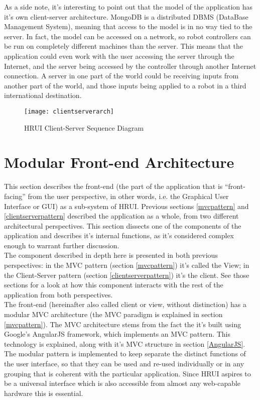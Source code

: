 As a side note, it's interesting to point out that the model of the application has it's own client-server architecture. 
MongoDB is a distributed DBMS (DataBase Management System), meaning that access to the model is in no way tied to the server. 
In fact, the model can be accessed on a network, so robot controllers can be run on completely different machines than the 
server. This means that the application could even work with the user accessing the server through the Internet, and the 
server being accessed by the controller through another Internet connection. A server in one part of the world could be 
receiving inputs from another part of the world, and those inputs being applied to a robot in a third international 
destination.
\begin{figure}[H]
\centering
\captionsetup{justification=centering}
\texttt{[image: clientserverarch]}
\caption{HRUI Client-Server Sequence Diagram \label{clientserverarch}}
\end{figure}
\section{Modular Front-end Architecture} \label{modularfrontendarchitecture}
This section describes the front-end (the part of the application that is ``front-facing'' from the user perspective, in other 
words, i.e. the Graphical User Interface or GUI) as a sub-system of HRUI. Previous sections \ref{mvcpattern} and 
\ref{clientserverpattern} described the application as a whole, from two different architectural perspectives. This section 
dissects one of the components of the application and describes it's internal functions, as it's considered complex enough to 
warrant further discussion.\\

The component described in depth here is presented in both previous perspectives: in the MVC pattern (section 
\ref{mvcpattern}) it's called the View; in the Client-Server pattern (section \ref{clientserverpattern}) it's the client. See 
those sections for a look at how this component interacts with the rest of the application from both perspectives.\\

The front-end (hereinafter also called client or view, without distinction) has a modular MVC architecture (the MVC paradigm 
is explained in section \ref{mvcpattern}). The MVC architecture stems from the fact the it's built using Google's AngularJS 
framework, which implements an MVC pattern. This technology is explained, along with it's MVC structure in section 
\ref{AngularJS}. The modular pattern is implemented to keep separate the distinct functions of the user interface, so that 
they can be used and re-used individually or in any grouping that is coherent with the particular application. Since HRUI 
aspires to be a universal interface which is also accessible from almost any web-capable hardware this is essential.\\

